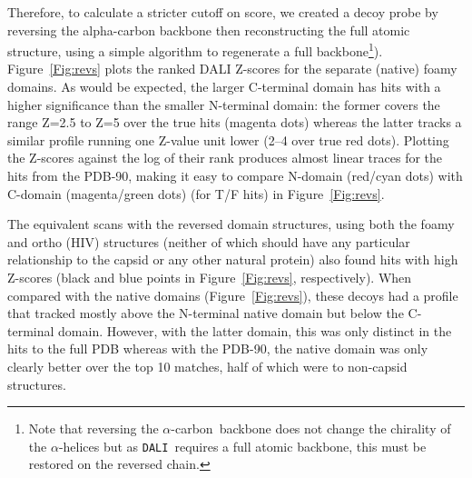 \documentclass{bmcart}
\newcommand{\A}{$\alpha$}
\newcommand{\CA}{$\alpha$-carbon}
\newcommand{\DALI}{{\tt DALI}}
\newcommand{\Fig}[1]{Figure~\ref{Fig:#1}}
\begin{document}
Therefore, to calculate a stricter cutoff on score, we created a decoy probe by reversing the
alpha-carbon backbone then reconstructing the full atomic structure, using a simple algorithm
to regenerate a full backbone\footnote{
Note that reversing the \CA\ backbone does not change the chirality of the \A-helices
but as \DALI\ requires a full atomic backbone, this must be restored on the reversed chain.
}).
\Fig{revs} plots the ranked DALI Z-scores for the separate (native) foamy domains.
As would be expected, the larger C-terminal domain has hits with a higher significance than the
smaller N-terminal domain:  the former covers the range Z=2.5 to Z=5 over the true hits (magenta
dots) whereas the latter tracks a similar profile running one Z-value unit lower (2--4 over true
red dots).  Plotting the Z-scores against the log of their rank produces almost linear traces
for the hits from the PDB-90, making it easy to compare N-domain (red/cyan dots) with C-domain
(magenta/green dots) (for T/F hits) in \Fig{revs}.

The equivalent scans with the reversed domain structures, using both the foamy and ortho (HIV) structures
(neither of which should have any particular relationship to the capsid or any other natural protein)
also found hits with high Z-scores (black and blue points in \Fig{revs}, respectively).
When compared with the native domains (\Fig{revs}), these decoys had a profile that tracked mostly above
the N-terminal native domain but below the C-terminal domain.  However, with the latter domain, this
was only distinct in the hits to the full PDB whereas with the PDB-90, the native domain was only clearly
better over the top 10 matches, half of which were to non-capsid structures.
\end{document}
